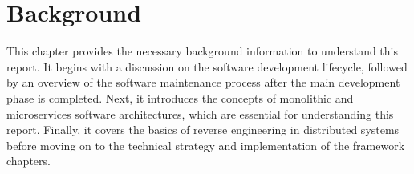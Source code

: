 \chapter{Background}\label{chap:background}

This chapter provides the necessary background information to understand this report. It begins with a discussion on the software development lifecycle, followed by an overview of the software maintenance process after the main development phase is completed. Next, it introduces the concepts of monolithic and microservices software architectures, which are essential for understanding this report. Finally, it covers the basics of reverse engineering in distributed systems before moving on to the technical strategy and implementation of the framework chapters.